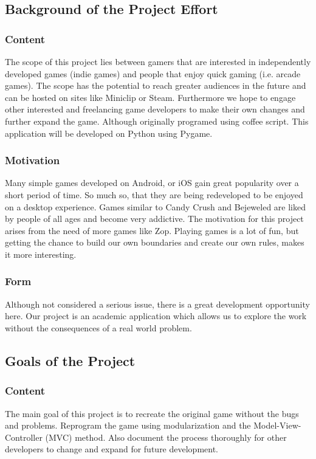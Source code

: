 \documentclass[12pt]{article}
\begin{document}
\subsection{Background of the Project Effort}
\subsubsection{Content}
 The scope of this project lies between gamers that are interested in independently developed games (indie games) and people that enjoy quick gaming (i.e. arcade games). The scope has the potential to reach greater audiences in the future and can be hosted on sites like Miniclip or Steam. Furthermore we hope to engage other interested and freelancing game developers to make their own changes and further expand the game. Although originally programed using coffee script. This application will be developed on Python using Pygame.
\subsubsection{Motivation}
 Many simple games developed on Android, or iOS gain great popularity over a short period of time. So much so, that they are being redeveloped to be enjoyed on a desktop experience. Games similar to Candy Crush and Bejeweled are liked by people of all ages and become very addictive. The motivation for this project arises from the need of more games like Zop. Playing games is a lot of fun, but getting the chance to build our own boundaries and create our own rules, makes it more interesting.
\subsubsection{Form}
 Although not considered a serious issue, there is a great development opportunity here. Our project is an academic application which allows us to explore the work without the consequences of a real world problem.
\subsection{Goals of the Project}
\subsubsection{Content}
 The main goal of this project is to recreate the original game without the bugs and problems. Reprogram the game using modularization and the Model-View-Controller (MVC) method. Also document the process thoroughly for other developers to change and expand for future development.
\end{document}
